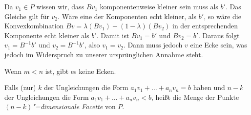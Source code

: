 \begin{Bew}
  Da $v_1 \in P$ wissen wir, dass $B v_1$ komponentenweise kleiner sein muss als $b'$. Das Gleiche gilt für $v_2$. Wäre eine der Komponenten echt kleiner, als $b'$, so wäre die Konvexkombination $B v = \lambda (B v_1) + (1-\lambda)(B v_2)$ in der entsprechenden Komponente echt kleiner als $b'$.  Damit ist $B v_1 = b'$ und $B v_2 = b'$. Daraus folgt $v_1 = B^{-1} b'$ und $v_2 = B^{-1} b'$, also $v_1 = v_2$. Dann muss jedoch $v$ eine Ecke sein, was jedoch im Widerspruch zu unserer ursprünglichen Annahme steht.
\end{Bew}

\begin{Bem}
  \hspace{\parindent}Wenn $m < n$ ist, gibt es keine Ecken.
\end{Bem}

Falls (nur) $k$ der Ungleichungen die Form $a_1 v_1 + \ldots + a_n v_n = b$ haben und $n-k$ der Ungleichungen die Form $a_1 v_1 + \ldots + a_n v_n < b$, heißt die Menge der Punkte \textit{$(n-k)$"=dimensionale Facette} von $P$.

